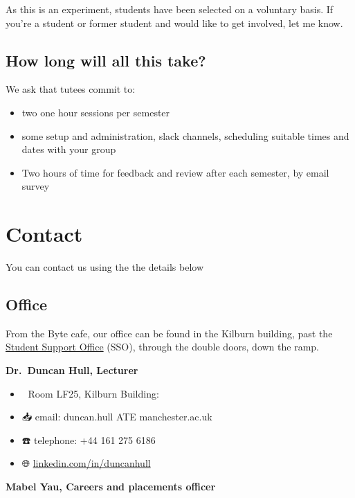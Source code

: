 \documentclass[12pt,]{book}
\providecommand{\tightlist}{%
  \setlength{\itemsep}{0pt}\setlength{\parskip}{0pt}}
\begin{document}
As this is an experiment, students have been selected on a voluntary basis. If you're a student or former student and would like to get involved, let me know.

\hypertarget{how-long-will-all-this-take}{%
\section{How long will all this take?}\label{how-long-will-all-this-take}}

We ask that tutees commit to:

\begin{itemize}
\tightlist
\item
  two one hour sessions per semester
\item
  some setup and administration, slack channels, scheduling suitable times and dates with your group
\item
  Two hours of time for feedback and review after each semester, by email survey
\end{itemize}

\hypertarget{contact}{%
\chapter{Contact}\label{contact}}

You can contact us using the the details below

\hypertarget{office}{%
\section{Office}\label{office}}

From the Byte cafe, our office can be found in the Kilburn building, past the \href{https://studentnet.cs.manchester.ac.uk/student-services/}{Student Support Office} (SSO), through the double doors, down the ramp.

\textbf{Dr.~Duncan Hull, Lecturer} 👨‍💻

\begin{itemize}
\tightlist
\item
  🏢 Room LF25, Kilburn Building:
\item
  📥 email: duncan.hull ATE manchester.ac.uk
\item
  ☎️ telephone: +44 161 275 6186
\item
  🌐 \href{https://uk.linkedin.com/in/duncanhull}{linkedin.com/in/duncanhull}
\end{itemize}

\textbf{Mabel Yau, Careers and placements officer} 👩‍💻
\end{document}
